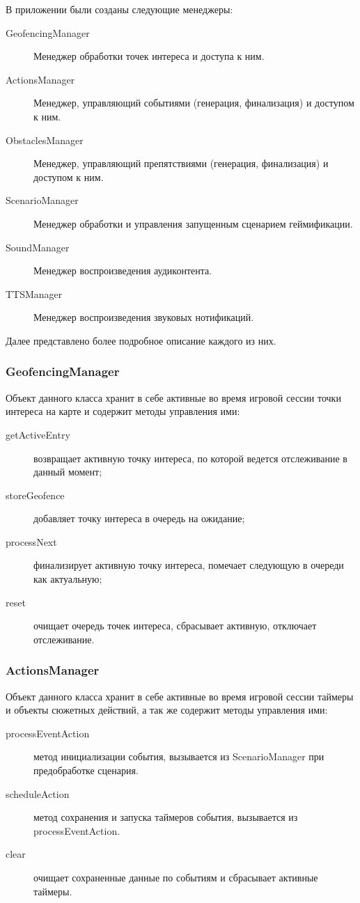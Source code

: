 В приложении были созданы следующие менеджеры:
\begin{description}
	\item[GeofencingManager] Менеджер обработки точек интереса и доступа к ним.
	\item[ActionsManager] Менеджер, управляющий событиями (генерация, финализация) и доступом к ним.
	\item[ObstaclesManager] Менеджер, управляющий препятствиями (генерация, финализация) и доступом к ним.
	\item[ScenarioManager] Менеджер обработки и управления запущенным сценарием геймификации.
	\item[SoundManager] Менеджер воспроизведения аудиконтента.
	\item[TTSManager] Менеджер воспроизведения звуковых нотификаций.
\end{description}
\smallskip
Далее представлено более подробное описание каждого из них.

\subsubsection*{GeofencingManager}
\label{subsubsec:geofencing_manager}
Объект данного класса хранит в себе активные во время игровой сессии точки интереса на карте и содержит методы управления ими:
\begin{description}
	\item[getActiveEntry] возвращает активную точку интереса, по которой ведется отслеживание в данный момент;
	\item[storeGeofence] добавляет точку интереса в очередь на ожидание;
	\item[processNext] финализирует активную точку интереса, помечает следующую в очереди как актуальную;
	\item[reset] очищает очередь точек интереса, сбрасывает активную, отключает отслеживание.
\end{description}

\subsubsection*{ActionsManager}
Объект данного класса хранит в себе активные во время игровой сессии таймеры и объекты сюжетных действий, а так же содержит методы управления ими:
\begin{description}
	\item[processEventAction] метод инициализации события, вызывается из ScenarioManager при предобработке сценария. 
	\item[scheduleAction] метод сохранения и запуска таймеров события, вызывается из processEventAction.
	\item[clear] очищает сохраненные данные по событиям и сбрасывает активные таймеры.
\end{description}

